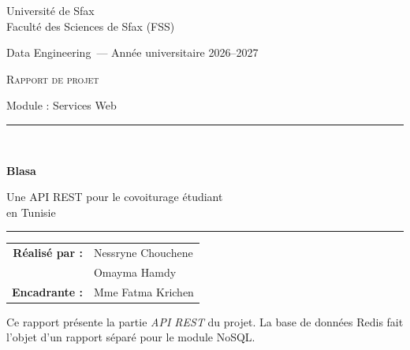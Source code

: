 \documentclass[11pt,a4paper]{article}
\newcommand{\auteurA}{Nessryne Chouchene}          %
\newcommand{\auteurB}{Omayma Hamdy}          %
\newcommand{\niveau}{Data Engineering}
\newcommand{\annee}{2026--2027}
\newcommand{\encadrante}{Mme Fatma Krichen}
\begin{document}
\begin{titlepage}
\centering
{\large Universit\'e de Sfax\\[2pt] Facult\'e des Sciences de Sfax (FSS)\par}
\vspace{0.6cm}
{\normalsize \niveau\ --- Ann\'ee universitaire \annee\par}
\vspace{2.2cm}
{\large\scshape Rapport de projet\par}
{\large Module : Services Web\par}
\vspace{1cm}
\rule{\textwidth}{1.2pt}\\[0.5cm]
{\Huge\bfseries\color{brand} Blasa\par}
\vspace{0.3cm}
{\Large Une API REST pour le covoiturage \'etudiant\\ en Tunisie\par}
\rule{\textwidth}{1.2pt}
\vspace{2.2cm}

\begin{tabular}{rl}
\textbf{R\'ealis\'e par :} & \auteurA \\ & \auteurB \\[6pt]
\textbf{Encadrante :} & \encadrante
\end{tabular}

\vfill
{\small Ce rapport pr\'esente la partie \emph{API REST} du projet. La base de donn\'ees Redis fait l'objet d'un rapport s\'epar\'e pour le module NoSQL.}
\end{titlepage}

\begin{abstract}
\noindent Blasa est une application de covoiturage pour les \'etudiants tunisiens. Ce rapport pr\'esente le \textbf{service web REST} qui en constitue le c\oe ur : une API en Java (Jersey, JAX-RS) qui expose des \textbf{ressources} (utilisateurs, trajets, r\'eservations, notes, statistiques) au travers des m\'ethodes HTTP \texttt{GET}, \texttt{POST}, \texttt{PUT}, \texttt{PATCH} et \texttt{DELETE}, avec des codes de r\'eponse pr\'ecis (200, 201, 204, 400, 404, 409) et des \'echanges au format JSON. Nous d\'ecrivons la conception de l'API, son impl\'ementation, l'interface web qui la consomme et la d\'emarche de test (Postman).

\medskip
\noindent\textbf{Mots-cl\'es :} services web, REST, HTTP, JSON, JAX-RS, Jersey, Postman, API.
\end{abstract}
\end{document}
